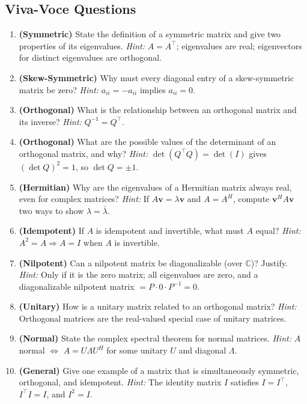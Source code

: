 \documentclass[12pt,a4paper]{article}
\begin{document}
\subsection*{Viva-Voce Questions}

\begin{enumerate}[label=\textbf{V\arabic*.}]
  \item \textbf{(Symmetric)} State the definition of a symmetric matrix and give two properties of its eigenvalues.
    \textit{Hint:} $A = A^\top$; eigenvalues are real; eigenvectors for distinct eigenvalues are orthogonal.
  \item \textbf{(Skew-Symmetric)} Why must every diagonal entry of a skew-symmetric matrix be zero?
    \textit{Hint:} $a_{ii} = -a_{ii}$ implies $a_{ii} = 0$.
  \item \textbf{(Orthogonal)} What is the relationship between an orthogonal matrix and its inverse?
    \textit{Hint:} $Q^{-1} = Q^\top$.
  \item \textbf{(Orthogonal)} What are the possible values of the determinant of an orthogonal matrix, and why?
    \textit{Hint:} $\det(Q^\top Q) = \det(I)$ gives $(\det Q)^2 = 1$, so $\det Q = \pm 1$.
  \item \textbf{(Hermitian)} Why are the eigenvalues of a Hermitian matrix always real, even for complex matrices?
    \textit{Hint:} If $A\mathbf{v} = \lambda\mathbf{v}$ and $A = A^H$, compute $\mathbf{v}^H A\mathbf{v}$ two ways to show $\lambda = \bar\lambda$.
  \item \textbf{(Idempotent)} If $A$ is idempotent and invertible, what must $A$ equal?
    \textit{Hint:} $A^2 = A \Rightarrow A = I$ when $A$ is invertible.
  \item \textbf{(Nilpotent)} Can a nilpotent matrix be diagonalizable (over $\mathbb{C}$)? Justify.
    \textit{Hint:} Only if it is the zero matrix; all eigenvalues are zero, and a diagonalizable nilpotent matrix $= P \cdot 0 \cdot P^{-1} = 0$.
  \item \textbf{(Unitary)} How is a unitary matrix related to an orthogonal matrix?
    \textit{Hint:} Orthogonal matrices are the real-valued special case of unitary matrices.
  \item \textbf{(Normal)} State the complex spectral theorem for normal matrices.
    \textit{Hint:} $A$ normal $\Leftrightarrow$ $A = U\Lambda U^H$ for some unitary $U$ and diagonal $\Lambda$.
  \item \textbf{(General)} Give one example of a matrix that is simultaneously symmetric, orthogonal, and idempotent.
    \textit{Hint:} The identity matrix $I$ satisfies $I = I^\top$, $I^\top I = I$, and $I^2 = I$.
\end{enumerate}
\end{document}
